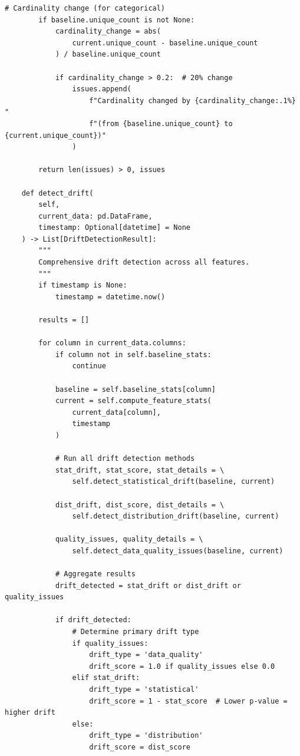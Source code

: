 \begin{lstlisting}[style=python, caption=Comprehensive feature monitoring and drift detection]
        # Cardinality change (for categorical)
        if baseline.unique_count is not None:
            cardinality_change = abs(
                current.unique_count - baseline.unique_count
            ) / baseline.unique_count

            if cardinality_change > 0.2:  # 20% change
                issues.append(
                    f"Cardinality changed by {cardinality_change:.1%} "
                    f"(from {baseline.unique_count} to {current.unique_count})"
                )

        return len(issues) > 0, issues

    def detect_drift(
        self,
        current_data: pd.DataFrame,
        timestamp: Optional[datetime] = None
    ) -> List[DriftDetectionResult]:
        """
        Comprehensive drift detection across all features.
        """
        if timestamp is None:
            timestamp = datetime.now()

        results = []

        for column in current_data.columns:
            if column not in self.baseline_stats:
                continue

            baseline = self.baseline_stats[column]
            current = self.compute_feature_stats(
                current_data[column],
                timestamp
            )

            # Run all drift detection methods
            stat_drift, stat_score, stat_details = \
                self.detect_statistical_drift(baseline, current)

            dist_drift, dist_score, dist_details = \
                self.detect_distribution_drift(baseline, current)

            quality_issues, quality_details = \
                self.detect_data_quality_issues(baseline, current)

            # Aggregate results
            drift_detected = stat_drift or dist_drift or quality_issues

            if drift_detected:
                # Determine primary drift type
                if quality_issues:
                    drift_type = 'data_quality'
                    drift_score = 1.0 if quality_issues else 0.0
                elif stat_drift:
                    drift_type = 'statistical'
                    drift_score = 1 - stat_score  # Lower p-value = higher drift
                else:
                    drift_type = 'distribution'
                    drift_score = dist_score


\end{lstlisting}
